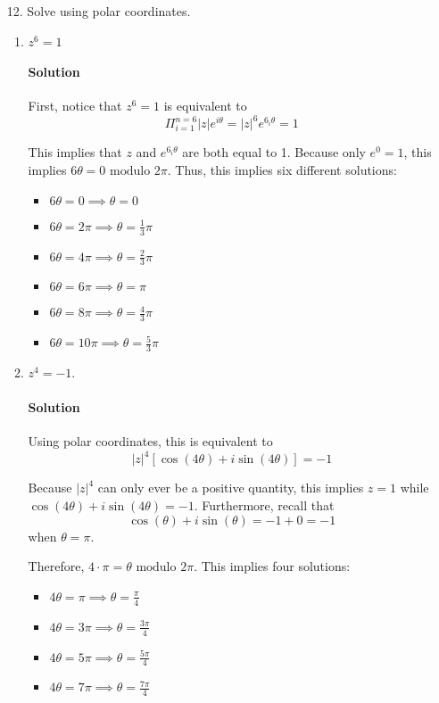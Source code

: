 \documentclass[11pt]{article}
\begin{document}
\begin{enumerate}
\begin{proof}
		\bigskip
		
		Now, for the other direction assume that $P(\overline{z}) = 0$. With 4c, this implies $\overline{P(z)} = 0$. Because zero is its own complex conjugate, this implies $P(z) = 0$ and this completes the proof.
	\end{proof}
	
	\item[12.] Solve using polar coordinates.
	
	\begin{enumerate}
		\item $z^6 = 1$
		\paragraph{Solution} First, notice that $z^6 = 1$ is equivalent to \[\Pi^{n=6}_{i=1} |z|e^{i\theta} = |z|^6 e^{6_i\theta} = 1\]
		
		This implies that $z$ and $e^{6_i\theta}$ are both equal to 1. Because only $e^0 = 1$, this implies $6\theta = 0 \text{ modulo } 2\pi$. Thus, this implies six different solutions:
		\begin{itemize}
			\item $6\theta = 0 \implies \theta = 0$
			\item $6\theta = 2\pi \implies \theta = \frac{1}{3}\pi$
			\item $6\theta = 4\pi \implies \theta = \frac{2}{3}\pi$
			\item $6\theta = 6\pi \implies \theta = \pi$
			\item $6\theta = 8\pi \implies \theta = \frac{4}{3}\pi$
			\item $6\theta = 10\pi \implies \theta = \frac{5}{3}\pi$			
		\end{itemize}
		
		\item $z^4 = -1$.
		\paragraph{Solution} Using polar coordinates, this is equivalent to 
		\[|z|^4[\cos(4\theta) + i\sin(4\theta)] = -1\]
		
		Because $|z|^4$ can only ever be a positive quantity, this implies $z = 1$ while $\cos(4\theta) + i\sin(4\theta) = -1$. Furthermore, recall that 
		\[\cos(\theta) + i\sin(\theta) = -1 + 0 = -1\]
		when $\theta = \pi$.
		
		Therefore, $4 \cdot \pi = \theta \text{ modulo } 2 \pi$. This implies four solutions:
		\begin{itemize}
			\item $4\theta = \pi \implies \theta = \frac{\pi}{4}$
			\item $4\theta = 3\pi \implies \theta = \frac{3\pi}{4}$
			\item $4\theta = 5\pi \implies \theta = \frac{5\pi}{4}$
			\item $4\theta = 7\pi \implies \theta = \frac{7\pi}{4}$
		\end{itemize}
	\end{enumerate}
	

\end{enumerate}
\end{document}
